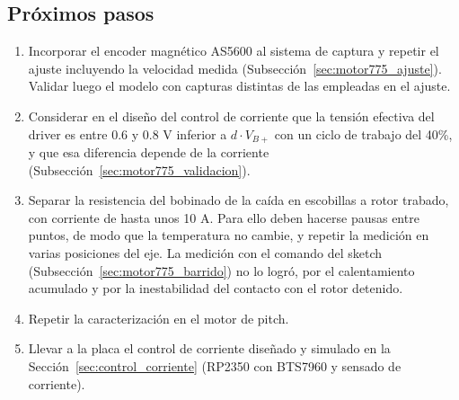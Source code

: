 \subsection{Próximos pasos}
\label{sec:motor775_pasos}
\begin{enumerate}
\item Incorporar el encoder magnético AS5600 al sistema de captura y repetir el ajuste incluyendo la velocidad medida (Subsección~\ref{sec:motor775_ajuste}). Validar luego el modelo con capturas distintas de las empleadas en el ajuste.
\item Considerar en el diseño del control de corriente que la tensión efectiva del driver es entre 0.6 y 0.8 V inferior a $d \cdot V_{B+}$ con un ciclo de trabajo del 40\%, y que esa diferencia depende de la corriente (Subsección~\ref{sec:motor775_validacion}).
\item Separar la resistencia del bobinado de la caída en escobillas a rotor trabado, con corriente de hasta unos 10 A. Para ello deben hacerse pausas entre puntos, de modo que la temperatura no cambie, y repetir la medición en varias posiciones del eje. La medición con el comando  del sketch (Subsección~\ref{sec:motor775_barrido}) no lo logró, por el calentamiento acumulado y por la inestabilidad del contacto con el rotor detenido.
\item Repetir la caracterización en el motor de pitch.
\item Llevar a la placa el control de corriente diseñado y simulado en la Sección~\ref{sec:control_corriente} (RP2350 con BTS7960 y sensado de corriente).
\end{enumerate}
